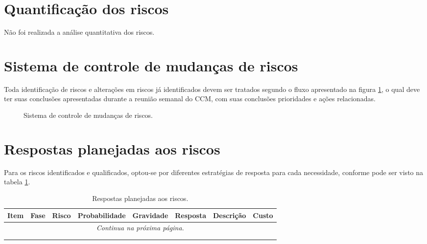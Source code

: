
\section{Quantificação dos riscos}

Não foi realizada a análise quantitativa dos riscos.

\section{Sistema de controle de mudanças de riscos}
\label{sec:risk-change-control-system}

Toda identificação de riscos e alterações em riscos já identificados devem ser tratados segundo o fluxo apresentado na figura \ref{fig:risk-change-control-system}, o qual deve ter suas conclusões apresentadas durante a reunião semanal do CCM, com suas conclusões prioridades e ações relacionadas.


\begin{figure}[h]
\centering
{}
\caption{Sistema de controle de mudanças de riscos.}
\label{fig:risk-change-control-system}
\end{figure}

\section{Respostas planejadas aos riscos}

Para os riscos identificados e qualificados, optou-se por diferentes estratégias de resposta para cada necessidade, conforme pode ser visto na tabela \ref{tab:risk-answers}.


\begin{longtable}{ l l l l l l l l }
	\toprule
	\textbf{Item} & \textbf{Fase} & \textbf{Risco} & \textbf{Probabilidade} & \textbf{Gravidade} & \textbf{Resposta} & \textbf{Descrição} & \textbf{Custo} \\
	\midrule
	\endhead
	\multicolumn{8}{c}{{\textit{Continua na próxima página.}}} \\
	\caption{Respostas planejadas aos riscos.}
	\endfoot
	\endlastfoot
	  &   &   &   &   &   &   &   \\
	\bottomrule
	\caption{Respostas planejadas aos riscos.}
	\centering
    \label{tab:risk-answers}
\end{longtable}

